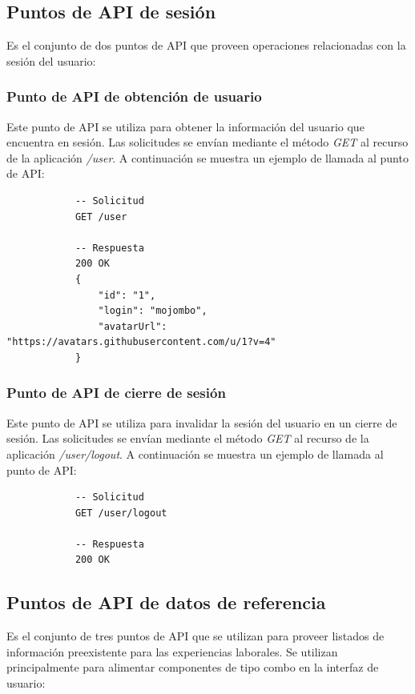 \documentclass[a4paper, 12pt]{book}
\begin{document}
    \subsection{Puntos de API de sesión}
    \label{subsec:session_endpoints}
    Es el conjunto de dos puntos de API que proveen operaciones relacionadas con la sesión del usuario:

    \subsubsection{Punto de API de obtención de usuario}
    \label{subsec:get_user}
    Este punto de API se utiliza para obtener la información del usuario que encuentra en sesión.
    Las solicitudes se envían mediante el método \emph{GET} al recurso de la aplicación \emph{/user}.
    A continuación se muestra un ejemplo de llamada al punto de API:

        {\scriptsize
    \linespread{1}
    \begin{verbatim}
			-- Solicitud
			GET /user

			-- Respuesta
			200 OK
			{
			    "id": "1",
			    "login": "mojombo",
			    "avatarUrl": "https://avatars.githubusercontent.com/u/1?v=4"
			}
    \end{verbatim}
    }

    \subsubsection{Punto de API de cierre de sesión}
    \label{subsec:get_user}
    Este punto de API se utiliza para invalidar la sesión del usuario en un cierre de sesión.
    Las solicitudes se envían mediante el método \emph{GET} al recurso de la aplicación \emph{/user/logout}.
    A continuación se muestra un ejemplo de llamada al punto de API:

        {\scriptsize
    \linespread{1}
    \begin{verbatim}
			-- Solicitud
			GET /user/logout

			-- Respuesta
			200 OK
    \end{verbatim}
    }

    \subsection{Puntos de API de datos de referencia}
    \label{subsec:reference_endpoints}
    Es el conjunto de tres puntos de API que se utilizan para proveer listados de información preexistente para las experiencias laborales.
    Se utilizan principalmente para alimentar componentes de tipo combo en la interfaz de usuario:
\end{document}

